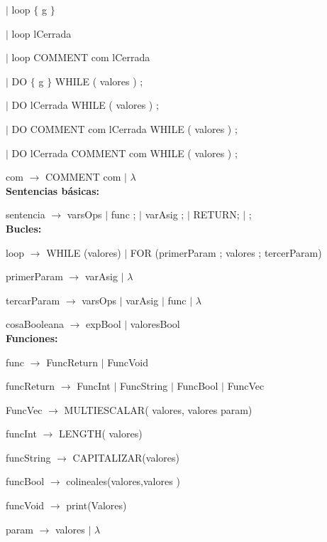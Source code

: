 \hspace{15mm}$|$ loop $\{$ g $\}$ 

\hspace{15mm}$|$ loop lCerrada 

\hspace{15mm}$|$ loop COMMENT com lCerrada

\hspace{15mm}$|$ DO $\{$ g $\}$ WHILE ( valores ) ;
  
\hspace{15mm}$|$ DO lCerrada WHILE ( valores ) ;  
  
\hspace{15mm}$|$  DO COMMENT com lCerrada WHILE ( valores ) ;

\hspace{15mm}$|$  DO lCerrada COMMENT com  WHILE ( valores ) ;

com $\rightarrow$  COMMENT com $|$ $\lambda$ \\

\textbf{Sentencias básicas:}

sentencia $\rightarrow$ varsOps $|$ func ; $|$ varAsig ; $|$ RETURN; $|$ ; \\


\textbf{Bucles:}

loop $\rightarrow$ WHILE (valores) $|$ FOR (primerParam ; valores ; tercerParam)

primerParam $\rightarrow$  varAsig $|$ $\lambda$

tercarParam $\rightarrow$  varsOps $|$ varAsig $|$ func $|$ $\lambda$

cosaBooleana $\rightarrow$ expBool $|$ valoresBool \\
  

\textbf{Funciones:}

func $\rightarrow$ FuncReturn $|$ FuncVoid

funcReturn $\rightarrow$ FuncInt $|$ FuncString $|$ FuncBool $|$ FuncVec

FuncVec $\rightarrow$ MULTIESCALAR( valores, valores param)

funcInt $\rightarrow$ LENGTH( valores)

funcString $\rightarrow$ CAPITALIZAR(valores)

funcBool $\rightarrow$ colineales(valores,valores )

funcVoid $\rightarrow$ print(Valores) 

param $\rightarrow$ valores $|$ $\lambda$ \\

